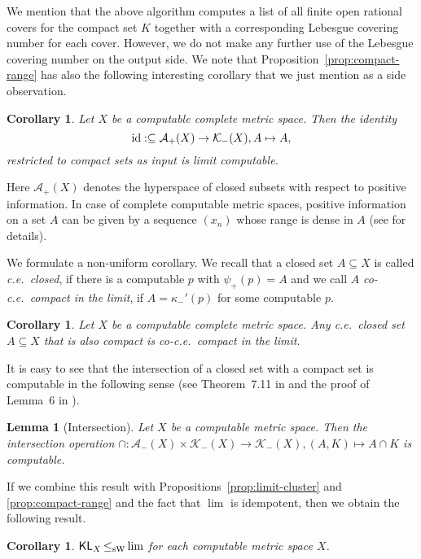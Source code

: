 \documentclass[a4paper]{amsart}
\def\AA{{\mathcal A}}
\def\KK{{\mathcal K}}
\def\In{\subseteq}
\def\id{{\rm id}}
\def\KL{\text{\rm\sffamily KL}}
\def\leqSW{\mathop{\leq_{\mathrm{sW}}}}
\newtheorem{lemma}[theorem]{Lemma}
\newtheorem{corollary}[theorem]{Corollary}
\theoremstyle{definition}
\begin{document}
We mention that the above algorithm computes a list of all finite open rational covers
for the compact set $K$ together with a corresponding Lebesgue covering number for each cover.
However, we do not make any further use of the Lebesgue covering number on the output side.
We note that Proposition~\ref{prop:compact-range} has also the following interesting corollary
that we just mention as a side observation.

\begin{corollary}
Let $X$ be a computable complete metric space. Then the identity
\[\id:\In\AA_+(X)\to\KK_-(X),A\mapsto A,\]
restricted to compact sets as input is limit computable.
\end{corollary}

Here $\AA_+(X)$ denotes the hyperspace of closed subsets with respect to positive information.
In case of complete computable metric spaces,  positive information on a set $A$ can be given by a sequence $(x_n)$
whose range is dense in $A$ (see \cite{BP03} for details).

We formulate a non-uniform corollary. We recall that a closed set $A\In X$ is called {\em c.e.\ closed},
if there is a computable $p$ with $\psi_+(p)=A$ and we call $A$ {\em co-c.e.\ compact in the limit},
if $A=\kappa_-'(p)$ for some computable $p$.

\begin{corollary}
Let $X$ be a computable complete metric space. Any c.e.\ closed set $A\In X$ that is also compact 
is co-c.e.\ compact in the limit.
\end{corollary}

It is easy to see that the intersection of a closed set with a compact set is computable
in the following sense (see Theorem~7.11 in \cite{BG09} and the proof of Lemma~6 in \cite{Bra08b}).

\begin{lemma}[Intersection]
\label{lem:intersection}
Let $X$ be a computable metric space. Then the intersection operation
$\cap:\AA_-(X)\times\KK_-(X)\to\KK_-(X),(A,K)\mapsto A\cap K$
is computable.
\end{lemma}

If we combine this result with Propositions~\ref{prop:limit-cluster} and \ref{prop:compact-range}
and the fact that $\lim$ is idempotent, then we obtain the following result.

\begin{corollary}
\label{cor:lim-cluster-compact}
$\KL_X\leqSW\lim$ for each computable metric space $X$.  
\end{corollary}
\end{document}
